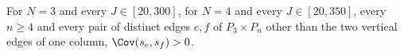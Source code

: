 \begin{theorem}[$\dagger$]\label{thm:rhcover}
For $N=3$ and every $J\in[20,300]$, for $N=4$ and every $J\in[20,350]$, every $n\ge4$ and every pair of distinct edges $e,f$ of $P_3\times P_n$
other than the two vertical edges of one column, $\Cov(s_e,s_f)>0$.
\end{theorem}

